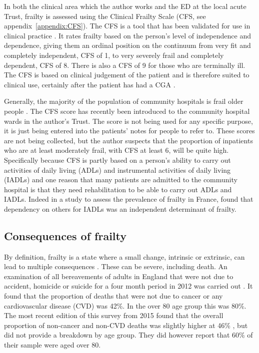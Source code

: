 \documentclass
[
	12pt,
	a4paper,
	oneside,
]{article}
\begin{document}
In both the clinical area which the author works and the ED at
the local acute Trust, frailty is assessed using the Clinical Frailty Scale (CFS,
see appendix~\ref{appendix:CFS}).
The CFS is a tool that has been validated for use in clinical practice 
\parencite{rockwood:05}. It rates frailty based on the person's level of independence
and dependence, giving them an ordinal position on the continuum from very fit and completely 
independent, CFS of 1, to very severely frail and completely dependent, CFS of 8.
There is also a CFS of 9 for those who are terminally ill. The CFS is based on clinical
judgement of the patient and is therefore suited to clinical use, certainly after
the patient has had a CGA \parencite{bgs:14}.

Generally, the majority of the population of community hospitals is frail older 
people \parencite{silver:12}.
The CFS score has recently been introduced to the community hospital wards in the author's Trust. The
score is not being used for any specific purpose, it is just being entered into 
the patients' notes for people to refer to. These scores are not being collected, 
but the author suspects that the proportion of inpatients who are at least 
moderately frail, with CFS at least 6, will be quite high. Specifically because
CFS is partly based on a person's ability to carry out activities of daily living (ADLs)
and instrumental activities of daily living (IADLs) and one reason that many patients
are admitted to the community hospital is that they need rehabilitation to be
able to carry out ADLs and IADLs. Indeed in a study to assess the prevalence of frailty
in France, \textcite{cossec:16} found that dependency on others for IADLs was an 
independent determinant of frailty.

\subsection{Consequences of frailty}

By definition, frailty is a state where a small change, intrinsic or extrinsic, can
lead to multiple consequences \parencite{collard:12}. These can be severe, including 
death. An examination
of all bereavements of adults in England that were not due to accident, homicide or suicide for 
a four month period in 2012 was 
carried out \parencite{ons:13}. It found that the proportion of deaths
that were not due to cancer or any cardiovascular disease (CVD) was 42\%. In the over 80
age group this was 80\%. The most recent edition of this survey from 2015 found
that the overall proportion of non-cancer and non-CVD deaths was slightly higher 
at 46\% \parencite{ons:16}, but did not provide a breakdown by age group. They 
did however report that 60\% of their sample were aged over 80.
\end{document}
